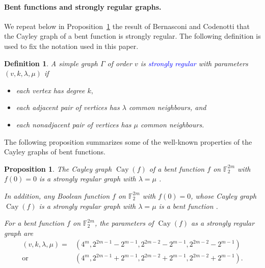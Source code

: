 \documentclass[12pt,a4paper]{article}
\newcommand{\mb}[1]{\mathbb{#1}}
\newcommand{\F}{\mb{F}}
\newcommand{\Emph}[1]{\emph{\textcolor{blue}{#1}}}
\newcommand{\Cay}[1]{\operatorname{Cay}\left(#1\right)}
\newtheorem{Proposition}{Proposition}
\newtheorem{Definition}{Definition}
\begin{document}
\paragraph*{Bent functions and strongly regular graphs.}
We repeat below in Proposition~\ref{pr-Cayley-bent-strongly-regular}
the result of Bernasconi and Codenotti \cite{BerC99}
that the Cayley graph of a bent function is strongly regular.
The following definition is used to fix the notation used in this paper.
\begin{Definition}
\label{def-strongly-regular-graph}
%
A simple graph $\Gamma$ of order $v$ is \Emph{strongly regular} \cite{Bos63,BroCN89,Sei79} with
parameters
$(v,k,\lambda,\mu)$ if
\begin{itemize}
 \item
each vertex has degree $k,$
 \item
each adjacent pair of vertices has $\lambda$ common neighbours, and
\item
each nonadjacent pair of vertices has $\mu$ common neighbours.
\end{itemize}
%
\end{Definition}
%


The following proposition summarizes some of the well-known properties of the Cayley graphs of bent functions.
\begin{Proposition}
\label{pr-Cayley-bent-strongly-regular}
The Cayley graph $\Cay{f}$ of a bent function $f$ on $\F_2^{2m}$
with $f(0)=0$ is a strongly regular graph with $\lambda = \mu$ \cite[Lemma 12]{BerC99}.

In addition, any Boolean function $f$ on $\F_2^{2m}$ with $f(0)=0$,
whose Cayley graph $\Cay{f}$ is a strongly regular graph with $\lambda = \mu$ is a bent function
\cite[Theorem 3]{BerCV01} \cite[Theorem 3.1]{Sta07}.

For a bent function $f$ on $\F_2^{2m}$,
the parameters of $\Cay{f}$ as a strongly regular graph
are \cite[Theorem 6.2.10]{Dil74} \cite[Theorem 3.2]{HuaY04}
\begin{align*}
(v,k,\lambda,\mu) = &(4^m, 2^{2 m - 1} - 2^{m-1}, 2^{2 m - 2} - 2^{m-1}, 2^{2 m - 2} - 2^{m-1})
\\
  \text{or} \quad &(4^m, 2^{2 m - 1} + 2^{m-1}, 2^{2 m - 2} + 2^{m-1}, 2^{2 m - 2} + 2^{m-1}).
\end{align*}
\end{Proposition}
\end{document}
